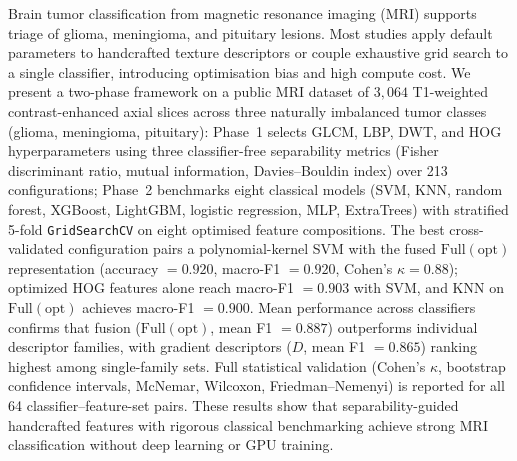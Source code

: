 Brain tumor classification from magnetic resonance imaging (MRI) supports triage of glioma, meningioma, and pituitary lesions.
Most studies apply default parameters to handcrafted texture descriptors or couple exhaustive grid search to a single classifier, introducing optimisation bias and high compute cost.
We present a two-phase framework on a public MRI dataset of $3{,}064$ T1-weighted contrast-enhanced axial slices across three naturally imbalanced tumor classes (glioma, meningioma, pituitary): Phase~1 selects GLCM, LBP, DWT, and HOG hyperparameters using three classifier-free separability metrics (Fisher discriminant ratio, mutual information, Davies--Bouldin index) over 213 configurations; Phase~2 benchmarks eight classical models (SVM, KNN, random forest, XGBoost, LightGBM, logistic regression, MLP, ExtraTrees) with stratified 5-fold \texttt{GridSearchCV} on eight optimised feature compositions.
The best cross-validated configuration pairs a polynomial-kernel SVM with the fused $\mathrm{Full(opt)}$ representation (accuracy $=0.920$, macro-F1 $=0.920$, Cohen's $\kappa=0.88$); optimized HOG features alone reach macro-F1 $=0.903$ with SVM, and KNN on $\mathrm{Full(opt)}$ achieves macro-F1 $=0.900$.
Mean performance across classifiers confirms that fusion ($\mathrm{Full(opt)}$, mean F1 $=0.887$) outperforms individual descriptor families, with gradient descriptors ($D$, mean F1 $=0.865$) ranking highest among single-family sets.
Full statistical validation (Cohen's $\kappa$, bootstrap confidence intervals, McNemar, Wilcoxon, Friedman--Nemenyi) is reported for all 64 classifier--feature-set pairs.
These results show that separability-guided handcrafted features with rigorous classical benchmarking achieve strong MRI classification without deep learning or GPU training.
